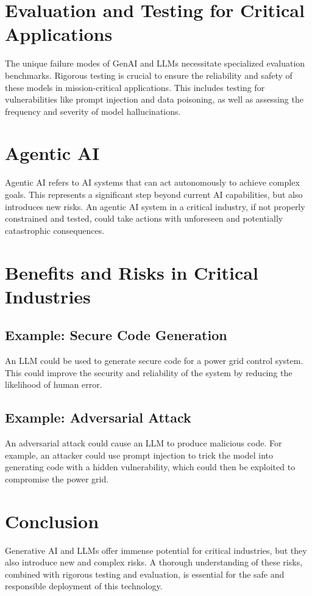 \section{Evaluation and Testing for Critical Applications}

The unique failure modes of GenAI and LLMs necessitate specialized evaluation benchmarks. Rigorous testing is crucial to ensure the reliability and safety of these models in mission-critical applications. This includes testing for vulnerabilities like prompt injection and data poisoning, as well as assessing the frequency and severity of model hallucinations.

\section{Agentic AI}

Agentic AI refers to AI systems that can act autonomously to achieve complex goals. This represents a significant step beyond current AI capabilities, but also introduces new risks. An agentic AI system in a critical industry, if not properly constrained and tested, could take actions with unforeseen and potentially catastrophic consequences.

\section{Benefits and Risks in Critical Industries}

\subsection{Example: Secure Code Generation}

An LLM could be used to generate secure code for a power grid control system. This could improve the security and reliability of the system by reducing the likelihood of human error.

\subsection{Example: Adversarial Attack}

An adversarial attack could cause an LLM to produce malicious code. For example, an attacker could use prompt injection to trick the model into generating code with a hidden vulnerability, which could then be exploited to compromise the power grid.

\section{Conclusion}

Generative AI and LLMs offer immense potential for critical industries, but they also introduce new and complex risks. A thorough understanding of these risks, combined with rigorous testing and evaluation, is essential for the safe and responsible deployment of this technology.